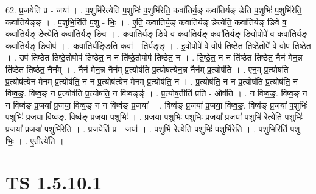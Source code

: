 \documentclass[17pt]{extarticle}
\begin{document}
62. प्र॒जयेति॑ प्र - जया᳚ । . प॒शुभि॑रेत्येति प॒शुभिः॑ प॒शुभि॑रेति॒ कवा॑तिर्य॒ङ् कवा॑तिर्यङ् ङेति प॒शुभिः॑ प॒शुभि॑रेति॒ कवा॑तिर्यङ्ङ् । . प॒शुभि॒रिति॑ प॒शु - भिः॒ । . ए॒ति॒ कवा॑तिर्य॒ङ् कवा॑तिर्यङ् ङेत्येति॒ कवा॑तिर्यङ् ङिवे व॒ कवा॑तिर्यङ् ङेत्येति॒ कवा॑तिर्यङ् ङिव । . कवा॑तिर्यङ् ङिवे व॒ कवा॑तिर्य॒ङ् कवा॑तिर्यङ् ङि॒वोपोपे॑ व॒ कवा॑तिर्य॒ङ् कवा॑तिर्यङ् ङि॒वोप॑ । . कवा॑तिर्य॒ङ्ङिति॒ कवा᳚ - ति॒र्य॒ङ्ङ्॒ । . इ॒वोपोपे॑ वे॒ वोप॑ तिष्ठेत तिष्ठे॒तोपे॑ वे॒ वोप॑ तिष्ठेत । . उप॑ तिष्ठेत तिष्ठे॒तोपोप॑ तिष्ठेत॒ न न ति॑ष्ठे॒तोपोप॑ तिष्ठेत॒ न । . ति॒ष्ठे॒त॒ न न ति॑ष्ठेत तिष्ठेत॒ नैन॑ मेन॒न्न ति॑ष्ठेत तिष्ठेत॒ नैन᳚म् । . नैन॑ मेन॒न्न नैन॑म् प्र॒त्योष॑ति प्र॒त्योष॑त्येन॒न्न नैन॑म् प्र॒त्योष॑ति । . ए॒न॒म् प्र॒त्योष॑ति प्र॒त्योष॑त्येन मेनम् प्र॒त्योष॑ति॒ न न प्र॒त्योष॑त्येन मेनम् प्र॒त्योष॑ति॒ न । . प्र॒त्योष॑ति॒ न न प्र॒त्योष॑ति प्र॒त्योष॑ति॒ न विष्व॒ङ्॒. विष्व॒ङ् न प्र॒त्योष॑ति प्र॒त्योष॑ति॒ न विष्वङ्ङ्॑ । . प्र॒त्योष॒तीति॑ प्रति - ओष॑ति । . न विष्व॒ङ्॒. विष्व॒ङ् न न विष्व॑ङ् प्र॒जया᳚ प्र॒जया॒ विष्व॒ङ् न न विष्व॑ङ् प्र॒जया᳚ । . विष्व॑ङ् प्र॒जया᳚ प्र॒जया॒ विष्व॒ङ्॒. विष्व॑ङ् प्र॒जया॑ प॒शुभिः॑ प॒शुभिः॑ प्र॒जया॒ विष्व॒ङ्॒. विष्व॑ङ् प्र॒जया॑ प॒शुभिः॑ । . प्र॒जया॑ प॒शुभिः॑ प॒शुभिः॑ प्र॒जया᳚ प्र॒जया॑ प॒शुभि॑ रेत्येति प॒शुभिः॑ प्र॒जया᳚ प्र॒जया॑ प॒शुभि॑रेति । . प्र॒जयेति॑ प्र - जया᳚ । . प॒शुभि॑ रेत्येति प॒शुभिः॑ प॒शुभि॑रेति । . प॒शुभि॒रिति॑ प॒शु - भिः॒ । . ए॒तीत्ये॑ति । \newline
\pagebreak
{}

\section{ TS 1.5.10.1 }
\end{document}
